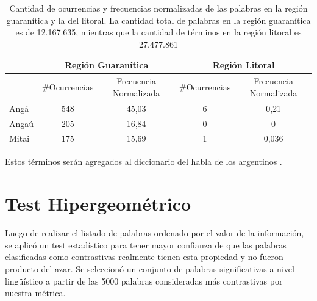 \begin{table}
\centering

\begin{tabular}{|l|cc|cc|}
\hline
 & \multicolumn{2}{c}{Región Guaranítica} & \multicolumn{2}{c}{Región Litoral} \\ \hline
      & \#Ocurrencias & Frecuencia Normalizada & \#Ocurrencias & Frecuencia Normalizada \\
Angá  & 548              & 45,03       & 6             & 0,21                  \\
Angaú & 205               & 16,84   & 0               & 0                     \\
Mitai & 175              & 15,69      & 1              & 0,036    \\ \hline              
\end{tabular}

\caption{Cantidad de ocurrencias y frecuencias normalizadas de las palabras en la región guaranítica y la del litoral. La cantidad total de palabras en la región guaranítica es de 12.167.635, mientras que la cantidad de términos en la región litoral es 27.477.861 }
\label{tab:guaranismos}
\end{table}

Estos términos serán agregados al diccionario del habla de los argentinos \cite{academia2008diccionario}.


\section{Test Hipergeométrico}
Luego de realizar el listado de palabras ordenado por el valor de la información, se aplicó un test estadístico para tener mayor confianza de que las palabras clasificadas como contrastivas realmente tienen esta propiedad y no fueron producto del azar. Se seleccionó un conjunto de palabras significativas a nivel lingüístico a partir de las 5000 palabras consideradas más contrastivas por nuestra métrica. 


